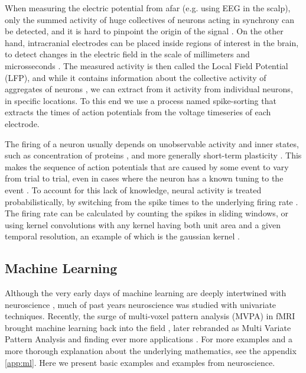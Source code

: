     When measuring the electric potential from afar (e.g. using EEG in the scalp), only the summed activity of huge collectives of neurons acting in synchrony can be detected, and it is hard to pinpoint the origin of the signal \cite{buzsaki2012origin}. On the other hand, intracranial electrodes can be placed inside regions of interest in the brain, to detect changes in the electric field in the scale of millimeters and microsseconds \cite{}. The measured activity is then called the Local Field Potential (LFP), and while it contains information about the collective activity of aggregates of neurons \cite{buzsaki2012origin}, we can extract from it activity from individual neurons, in specific locations. To this end we use a process named spike-sorting \cite{rey2015past} that extracts the times of action potentials from the voltage timeseries of each electrode. 
    
    The firing of a neuron usually depends on unobservable activity and inner states, such as concentration of proteins \cite{}, and more generally short-term plasticity \cite{motanis2018short}. This makes the sequence of action potentials that are caused by some event to vary from trial to trial, even in cases where the neuron has a known tuning to the event \cite[p~7-8]{dayan2001theoretical}. To account for this lack of knowledge, neural activity is treated probabilistically, by switching from the spike times to the underlying firing rate \cite[p~9-11]{dayan2001theoretical}. The firing rate can be calculated by counting the spikes in sliding windows, or using kernel convolutions with any kernel having both unit area and a given temporal resolution, an example of which is the gaussian kernel \cite[p~9-11]{dayan2001theoretical}.
    
    \subsection{Machine Learning}
        Although the very early days of machine learning are deeply intertwined with neuroscience \cite{mcclelland1986parallel}, much of past years neuroscience was studied with univariate techniques. Recently, the surge of multi-voxel pattern analysis (MVPA) in fMRI brought machine learning back into the field \cite{}, later rebranded as Multi Variate Pattern Analysis and finding ever more applications \cite{haxby2012multivariate}. For more examples and a more thorough explanation about the underlying mathematics, see the appendix \ref{app:ml}. Here we present basic examples and examples from neuroscience.
        
